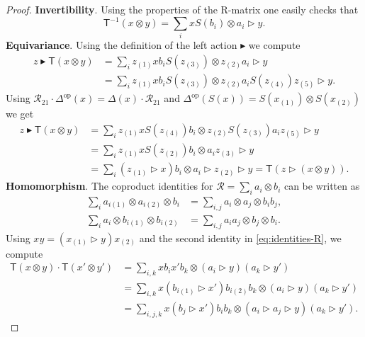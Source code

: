 \documentclass[10pt,a4paper]{amsart}
\newcommand{\calR}{\mathcal{R}}
\newcommand{\op}{\mathrm{op}}
\newcommand{\tmap}{\mathsf{T}}
\begin{document}
\begin{proof}
\textbf{Invertibility}. Using the properties of the R-matrix one easily checks that
\[
\tmap^{-1}(x \otimes y) = \sum_i x S(b_i) \otimes a_i \triangleright y.
\]
\textbf{Equivariance}. Using the definition of the left action $\blacktriangleright$ we compute
\[
\begin{split}
z \blacktriangleright \tmap(x \otimes y)
& = \sum_i z_{(1)} x b_i S(z_{(3)}) \otimes z_{(2)} a_i \triangleright y \\
& = \sum_i z_{(1)} x b_i S(z_{(3)}) \otimes z_{(2)} a_i S(z_{(4)}) z_{(5)} \triangleright y.
\end{split}
\]
Using $\calR_{2 1} \cdot \Delta^\op(x) = \Delta(x) \cdot \calR_{2 1}$ and $\Delta^\op(S(x)) = S(x_{(1)}) \otimes S(x_{(2)})$ we get
\[
\begin{split}
z \blacktriangleright \tmap(x \otimes y)
& = \sum_i z_{(1)} x S(z_{(4)}) b_i \otimes z_{(2)} S(z_{(3)}) a_i z_{(5)} \triangleright y \\
& = \sum_i z_{(1)} x S(z_{(2)}) b_i \otimes a_i z_{(3)} \triangleright y \\
& = \sum_i (z_{(1)} \triangleright x) b_i \otimes a_i \triangleright z_{(2)} \triangleright y = \tmap(z \triangleright (x \otimes y)).
\end{split}
\]
\textbf{Homomorphism}. The coproduct identities for $\calR = \sum_i a_i \otimes b_i$ can be written as
\begin{equation}
\label{eq:identities-R}
\begin{split}
\sum_i a_{i (1)} \otimes a_{i (2)} \otimes b_i & = \sum_{i, j} a_i \otimes a_j \otimes b_i b_j, \\
\sum_i a_i \otimes b_{i (1)} \otimes b_{i (2)} & = \sum_{i, j} a_i a_j \otimes b_j \otimes b_i.
\end{split}
\end{equation}
Using $x y = (x_{(1)} \triangleright y) x_{(2)}$ and the second identity in \eqref{eq:identities-R}, we compute
\[
\begin{split}
\tmap(x \otimes y) \cdot \tmap(x' \otimes y')
& = \sum_{i, k} x b_i x' b_k \otimes (a_i \triangleright y) (a_k \triangleright y') \\
& = \sum_{i, k} x (b_{i (1)} \triangleright x') b_{i (2)} b_k \otimes (a_i \triangleright y) (a_k \triangleright y') \\
& = \sum_{i, j, k} x (b_j \triangleright x') b_i b_k \otimes (a_i \triangleright a_j \triangleright y) (a_k \triangleright y').
\end{split}
\]
\end{proof}
\end{document}

